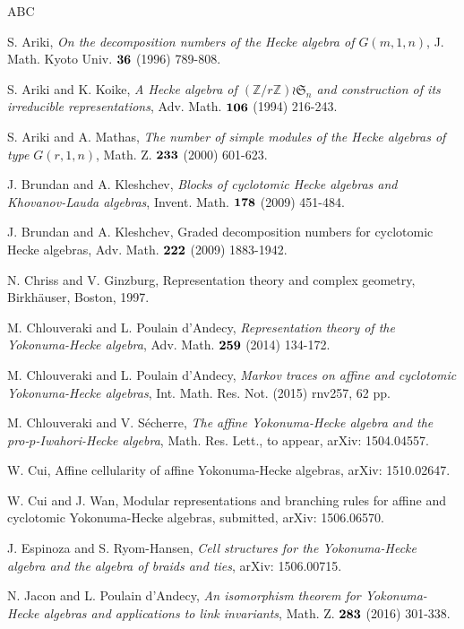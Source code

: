 \documentclass[11pt, reqno]{amsart} \textwidth=14.9cm \oddsidemargin=1cm \evensidemargin=1cm
\theoremstyle{definition}
\numberwithin{equation}{section}
\begin{document}
\begin{thebibliography}{ABC}

 S. Ariki, {\em On the decomposition numbers of the Hecke algebra of $G(m,1,n)$}, J. Math. Kyoto Univ. $\bf{36}$ (1996) 789-808.

S. Ariki and K. Koike, {\em A Hecke algebra of $(\mathbb{Z}/r\mathbb{Z})\wr \mathfrak{S}_{n}$ and construction of its irreducible representations}, Adv. Math. $\bf{106}$ (1994) 216-243.

 S. Ariki and A. Mathas, {\em The number of simple modules of the Hecke algebras of type $G(r,1,n)$}, Math. Z. $\bf{233}$ (2000) 601-623.

 J. Brundan and A. Kleshchev, {\em Blocks of cyclotomic Hecke algebras and Khovanov-Lauda algebras}, Invent. Math. $\bf{178}$ (2009) 451-484.

 J. Brundan and A. Kleshchev, Graded decomposition numbers for cyclotomic Hecke algebras, Adv. Math. $\bf{222}$ (2009) 1883-1942.

 N. Chriss and V. Ginzburg, Representation theory and complex geometry, Birkh\"{a}user, Boston, 1997.

  M. Chlouveraki and L. Poulain d'Andecy, {\em Representation theory of the Yokonuma-Hecke algebra}, Adv. Math. $\bf{259}$ (2014) 134-172.

  M. Chlouveraki and L. Poulain d'Andecy, {\em Markov traces on affine and cyclotomic Yokonuma-Hecke algebras}, Int. Math. Res. Not. (2015) rnv257, 62 pp.

  M. Chlouveraki and V. S\'{e}cherre, {\em The affine Yokonuma-Hecke algebra and the pro-$p$-Iwahori-Hecke algebra}, Math. Res. Lett., to appear, arXiv: 1504.04557.

 W. Cui, Affine cellularity of affine Yokonuma-Hecke algebras, arXiv: 1510.02647.

  W. Cui and J. Wan, Modular representations and branching rules for affine and cyclotomic Yokonuma-Hecke algebras, submitted, arXiv: 1506.06570.

J. Espinoza and S. Ryom-Hansen, {\em Cell structures for the Yokonuma-Hecke algebra and the algebra of braids and ties}, arXiv: 1506.00715.

  N. Jacon and L. Poulain d'Andecy, {\em An isomorphism theorem for Yokonuma-Hecke algebras and applications to link invariants}, Math. Z. $\bf{283}$ (2016) 301-338.



\end{thebibliography}
\end{document}
